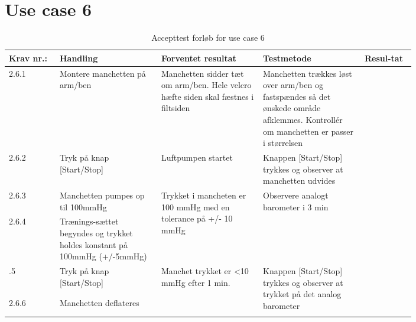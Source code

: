 \section{Use case 6}
						\begin{longtable}{|p{0.1\linewidth}|p{0.2\linewidth}|p{0.2\linewidth}|p{0.2\linewidth}|p{0.1\linewidth}|}
								\hline
								\rowcolor{usDef}
								Krav nr.: & Handling & Forventet resultat & Testmetode & Resul-tat  \\\hline
								2.6.1 & Montere manchetten på arm/ben & Manchetten sidder tæt om arm/ben. Hele velcro hæfte siden skal fæstnes i filtsiden & Manchetten trækkes løst over arm/ben og fastspændes så det ønskede område afklemmes. Kontrollér om manchetten er passer i størrelsen & \\ \hline
								2.6.2 & Tryk på knap [Start/Stop] & Luftpumpen startet & Knappen [Start/Stop] trykkes og observer at manchetten udvides  & \\ \hline
								2.6.3 & Manchetten pumpes op til 100mmHg & \multirow{2}{\linewidth}{Trykket i mancheten er 100 mmHg med en tolerance på +/- 10 mmHg}& \multirow{2}{\linewidth}{Observere analogt barometer i 3 min}& \multirow{2}{\linewidth}{} \\ \cline{1-2}
								2.6.4 & Trænings-sættet begyndes og trykket holdes konstant på 100mmHg (+/-5mmHg) & & & \\ \hline \newpage \hline
								2.6.5 & Tryk på knap [Start/Stop]  & \multirow{2}{\linewidth}{Manchet trykket er \textless  10 mmHg efter 1 min.} & \multirow{2}{\linewidth}{Knappen [Start/Stop] trykkes og observer at trykket på det analog barometer} & \multirow{2}{\linewidth}{} \\ [2cm] \cline{1-2}
								2.6.6 & Manchetten deflateres  & & & \\ \hline
								\caption{Accepttest forløb for use case 6}
						\end{longtable}